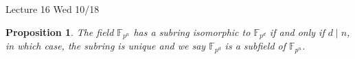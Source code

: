 \documentclass{article}
\def\F{{\mathbb F}}
\def\F{{\mathbb F}}
\newtheorem{proposition}[subsection]{Proposition}
\newcommand{\add}[1]{{\color{blue} #1}}
\begin{document}
\begin{comment}
    Let $f_1(x),\ldots,f_N(x)$ denote all the monic irreducible polynomials of degree dividing $n$. Then for $i\neq j$, we have $f_i(x)\notin(f_j(x))$. Then we have the factorization
$$x^{p^n} - x = f_1(x)f_2(x)\cdots f_N(x)h(x)$$ 
for some $h(x)\in \F_p[x].$ Suppose for a contradiction that $h(x)$ has degree at least $1$. Let $g(x)$ be an irreducible factor of $h(x)$. Then $x^{p^n} - x \in (g(x))$ and so $g = f_i$ for some $i=1,\ldots,N$. So $x^{p^n} - x = f_i(x)^2g_i(x)$ for some $g_i(x)\in\F_p[x]$. However, the derivative of $x^{p^n} - x$ is $p^nx^{p^n-1} - 1 = -1$ in $\F_p[x]$ but the derivative of $f_i(x)^2g_i(x)$ is $2f_i(x)f_i'(x)g(x) + f_i(x)^2g_i'(x)$, which is divisible by $f_i$. Contradiction. Therefore, $h(x)$ has degree $0$ and thus must be $1$ since $f_1,\ldots,f_N$ are all monic.
\end{comment}

\begin{center}
    \add{Lecture 16 Wed 10/18}
\end{center}
    
\begin{proposition}\label{prop:dmidn}
    The field $\F_{p^n}$ has a subring isomorphic to $\F_{p^d}$ if and only if $d\mid n$, in which case, the subring is unique and we say $\F_{p^d}$ is a subfield of $\F_{p^n}$.
\end{proposition}
\end{document}
